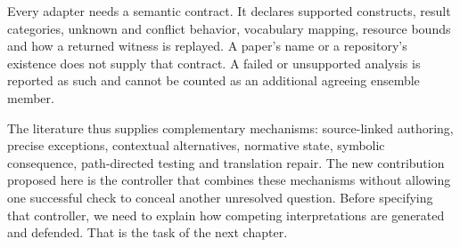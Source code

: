 
Every adapter needs a semantic contract. It declares supported constructs,
result categories, unknown and conflict behavior, vocabulary mapping,
resource bounds and how a returned witness is replayed. A paper's name or
a repository's existence does not supply that contract. A failed or
unsupported analysis is reported as such and cannot be counted as an
additional agreeing ensemble member.

The literature thus supplies complementary mechanisms: source-linked
authoring, precise exceptions, contextual alternatives, normative state,
symbolic consequence, path-directed testing and translation repair. The
new contribution proposed here is the controller that combines these
mechanisms without allowing one successful check to conceal another
unresolved question. Before specifying that controller, we need to explain
how competing interpretations are generated and defended. That is the task
of the next chapter.

